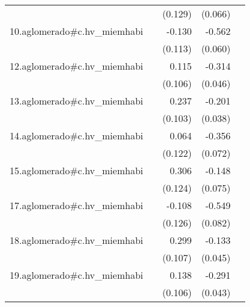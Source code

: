 {\begin{longtable}{l*{4}{D{.}{.}{-1}}}
            &                     &     (0.129)         &     (0.066)         &                     \\
\addlinespace
10.aglomerado#c.hv\_miemhabi&                     &      -0.130         &      -0.562\sym{***}&                     \\
            &                     &     (0.113)         &     (0.060)         &                     \\
\addlinespace
12.aglomerado#c.hv\_miemhabi&                     &       0.115         &      -0.314\sym{***}&                     \\
            &                     &     (0.106)         &     (0.046)         &                     \\
\addlinespace
13.aglomerado#c.hv\_miemhabi&                     &       0.237\sym{*}  &      -0.201\sym{***}&                     \\
            &                     &     (0.103)         &     (0.038)         &                     \\
\addlinespace
14.aglomerado#c.hv\_miemhabi&                     &       0.064         &      -0.356\sym{***}&                     \\
            &                     &     (0.122)         &     (0.072)         &                     \\
\addlinespace
15.aglomerado#c.hv\_miemhabi&                     &       0.306\sym{*}  &      -0.148\sym{*}  &                     \\
            &                     &     (0.124)         &     (0.075)         &                     \\
\addlinespace
17.aglomerado#c.hv\_miemhabi&                     &      -0.108         &      -0.549\sym{***}&                     \\
            &                     &     (0.126)         &     (0.082)         &                     \\
\addlinespace
18.aglomerado#c.hv\_miemhabi&                     &       0.299\sym{**} &      -0.133\sym{**} &                     \\
            &                     &     (0.107)         &     (0.045)         &                     \\
\addlinespace
19.aglomerado#c.hv\_miemhabi&                     &       0.138         &      -0.291\sym{***}&                     \\
            &                     &     (0.106)         &     (0.043)         &                     \\

\end{longtable}}
